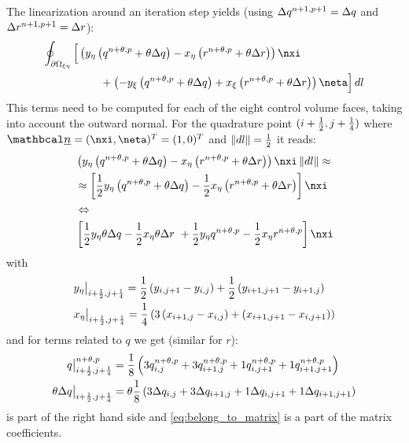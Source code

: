 The linearization around an iteration step yields (using $\Delta q^{n+1,p+1} = \Delta q$ and  $\Delta r^{n+1,p+1} = \Delta r$):
\begin{align}
    \oint_{\partial\Omega_{\xi\eta}} \Big[&\left( y_\eta\left(q^{n+\theta, p} + \theta \Delta q\right) - x_\eta \left( r^{n+\theta, p} + \theta \Delta r  \right)
    \right) \nxi
    \nonumber\\*
    &\qquad  + \left(-y_\xi\left(q^{n+\theta, p} + \theta \Delta q\right) +
      x_\xi\left( r^{n+\theta, p} + \theta \Delta r  \right) \right) \neta
      \Big]\, dl
\end{align}
This terms need to be computed for each of the eight control volume faces, taking into account the outward normal.
For the quadrature point $(i+\frac{1}{2}, j+\frac{1}{4})$ where $\vecn = (\nxi, \neta)^T = (1,0)^T$ and $\left\lVert dl \right\rVert = \frac{1}{2}$ it reads:
\begin{align}
&\left( y_\eta\left(q^{n+\theta, p} + \theta \Delta q\right) - x_\eta \left( r^{n+\theta, p} + \theta \Delta r  \right)
    \right) \nxi  \norm{dl} \approx
    \\
  &\approx \left[ \half y_\eta\left( q^{n+\theta, p} + \theta \Delta q \right)  -
  \half x_\eta \left( r^{n+\theta, p} + \theta \Delta r  \right) \right] \nxi
  \\
  &\Leftrightarrow \nonumber \\
  &\left[  \half y_\eta \theta \Delta q  -  \half x_\eta\theta \Delta r  \
  +
  \half y_\eta q^{n+\theta, p} - \half x_\eta r^{n+\theta, p} \right] \nxi
\end{align}
with
\begin{align}
    & y_\eta\big|_{i+\frac{1}{2}, j+\frac{1}{4}} = \frac{1}{2} \left( y_{i,j+1} - y_{i, j} \right) +
    \frac{1}{2} \left( y_{i+1,j+1} - y_{i+1, j} \right)
    \\*
    & x_\eta\big|_{i+\frac{1}{2}, j+\frac{1}{4}} = \frac{1}{4} \left(3 \left( x_{i+1,j} - x_{i, j} \right) +
 \left( x_{i+1,j+1} - x_{i, j+1} \right) \right)
\end{align}
and for terms related to $q$ we get (similar for $r$):
\begin{align}
    q\big|^{n+\theta,p}_{i+\frac{1}{2}, j+\frac{1}{4}} &= \frac{1}{8}\left(3 q^{n+\theta,p}_{i,j} + 3 q^{n+\theta,p}_{i+1,j} + 1 q^{n+\theta,p}_{i,j+1} + 1 q^{n+\theta,p}_{i+1,j+1} \right)
    \label{eq:belong_to_rhs}
    \\
    \theta \Delta q\big|_{i+\frac{1}{2}, j+\frac{1}{4}} &= \theta\frac{1}{8}\left(3 \Delta q_{i,j} + 3 \Delta q_{i+1,j} + 1 \Delta q_{i,j+1} + 1 \Delta q_{i+1,j+1} \right) \label{eq:belong_to_matrix}
\end{align}
 is part of the right hand side and \autoref{eq:belong_to_matrix} is a part of the matrix coefficients.

